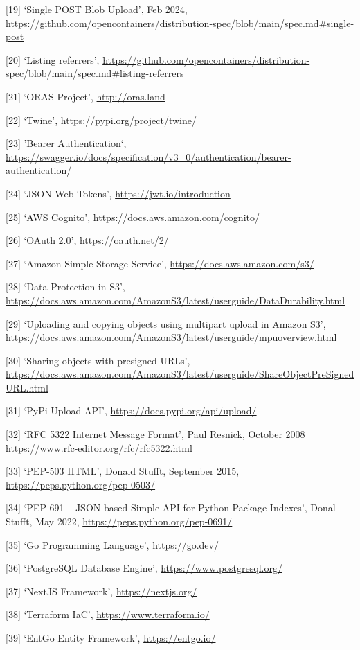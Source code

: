 \documentclass{article}
\begin{document}
  [19] `Single POST Blob Upload', Feb 2024, \url{https://github.com/opencontainers/distribution-spec/blob/main/spec.md#single-post}

  [20] `Listing referrers', \url{https://github.com/opencontainers/distribution-spec/blob/main/spec.md#listing-referrers}

  [21] `ORAS Project', \url{http://oras.land}

  [22] `Twine', \url{https://pypi.org/project/twine/}
  
  [23] 'Bearer Authentication`, \url{https://swagger.io/docs/specification/v3_0/authentication/bearer-authentication/}

  [24] `JSON Web Tokens', \url{https://jwt.io/introduction}

  [25] `AWS Cognito', \url{https://docs.aws.amazon.com/cognito/}

  [26] `OAuth 2.0', \url{https://oauth.net/2/}

  [27] `Amazon Simple Storage Service', \url{https://docs.aws.amazon.com/s3/}

  [28] `Data Protection in S3', \url{https://docs.aws.amazon.com/AmazonS3/latest/userguide/DataDurability.html}

  [29] `Uploading and copying objects using multipart upload in Amazon S3', \url{https://docs.aws.amazon.com/AmazonS3/latest/userguide/mpuoverview.html}

  [30] `Sharing objects with presigned URLs', \url{https://docs.aws.amazon.com/AmazonS3/latest/userguide/ShareObjectPreSignedURL.html}

  [31] `PyPi Upload API', \url{https://docs.pypi.org/api/upload/}

  [32] `RFC 5322 Internet Message Format', Paul Resnick, October 2008 \url{https://www.rfc-editor.org/rfc/rfc5322.html}

  [33] `PEP-503 HTML', Donald Stufft, September 2015, \url{https://peps.python.org/pep-0503/}

  [34] `PEP 691 – JSON-based Simple API for Python Package Indexes', Donal Stufft, May 2022, \url{https://peps.python.org/pep-0691/}
  
  [35] `Go Programming Language', \url{https://go.dev/}

  [36] `PostgreSQL Database Engine', \url{https://www.postgresql.org/}

  [37] `NextJS Framework', \url{https://nextjs.org/}

  [38] `Terraform IaC', \url{https://www.terraform.io/}

  [39] `EntGo Entity Framework', \url{https://entgo.io/}
\end{document}
